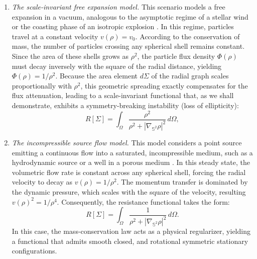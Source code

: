 \documentclass[a4paper,12pt]{amsart}
\theoremstyle{plain}
\theoremstyle{definition}
\begin{document}
\begin{enumerate}
\item {\it The scale-invariant free expansion model.} This scenario models a free expansion in a vacuum, analogous to the asymptotic regime of a stellar wind or the coasting phase of an isotropic explosion \cite{pa, pla}. In this regime, particles travel at a constant velocity $v(\rho) = v_0$. According to the conservation of mass, the number of particles crossing any spherical shell remains constant. Since the area of these shells grows as $\rho^2$, the particle flux density $\Phi(\rho)$ must decay inversely with the square of the radial distance, yielding $\Phi(\rho)=1/\rho^2$. Because the area element $d\Sigma$ of the radial graph scales proportionally with $\rho^2$, this geometric spreading exactly compensates for the flux attenuation, leading to a scale-invariant functional that, as we shall demonstrate, exhibits a symmetry-breaking instability (loss of ellipticity):
\begin{equation}\label{m1}
 R[\Sigma] = \int_{\Omega} \frac{\rho^2}{\rho^2 + |\nabla_{\mathbb{S}^2} \rho|^2} \, d\Omega,
\end{equation}
 

\item {\it The incompressible source flow model.} This model considers a point source emitting a continuous flow into a saturated, incompressible medium, such as a hydrodynamic source or a well in a porous medium \cite{batchelor2000, be,la}. In this steady state, the volumetric flow rate is constant across any spherical shell, forcing the radial velocity to decay as $v(\rho) = 1/\rho^2$. The momentum transfer is dominated by the dynamic pressure, which scales with the square of the velocity, resulting $v(\rho)^2 = 1/\rho^4$. Consequently, the resistance functional   takes the form:
\begin{equation}\label{m2}
 R[\Sigma] = \int_{\Omega} \frac{1}{\rho^2 + |\nabla_{\mathbb{S}^2} \rho|^2} \, d\Omega.
\end{equation}
 In this case, the mass-conservation law acts as a physical regularizer, yielding a functional that admits smooth closed, and  rotational symmetric stationary configurations.
 
\end{enumerate}
\end{document}
